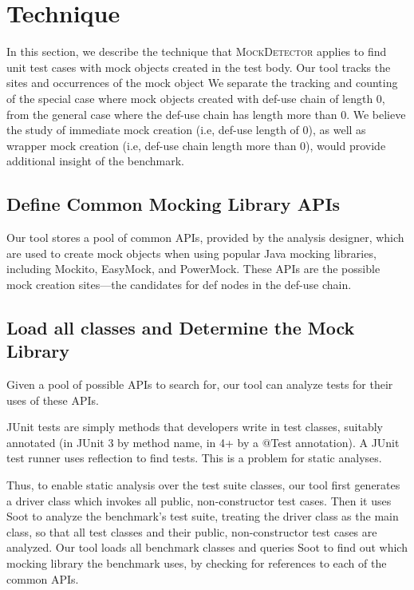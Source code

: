 \section{Technique}
\label{sec:technique}

In this section, we describe the technique that \textsc{MockDetector} applies to find unit test cases with mock objects created in the test body. Our tool tracks the sites and occurrences of the mock object  We separate the tracking and counting of the special case where mock objects created with def-use chain of length 0, from the general case where the def-use chain has length more than 0. We believe the study of immediate mock creation (i.e, def-use length of 0), as well as wrapper mock creation (i.e, def-use chain length more than 0), would provide additional insight of the benchmark. %

\subsection{Define Common Mocking Library APIs}
\label{subsec:collection}

Our tool stores a pool of common APIs, provided by the analysis designer, which are used to create mock objects when using popular Java mocking libraries, including Mockito, EasyMock, and PowerMock. These APIs are the possible mock creation sites---the candidates for def nodes in the def-use chain. %

\subsection{Load all classes and Determine the Mock Library}
\label{subsec:library}

Given a pool of possible APIs to search for, our tool can analyze tests for their uses of these APIs.%

JUnit tests are simply methods that developers write in test classes, suitably annotated (in JUnit 3 by method name, in 4+ by a @Test annotation). A JUnit test runner uses reflection to find tests. This is a problem for static analyses.

Thus, to enable static analysis over the test suite classes, our tool first generates a driver class which invokes all public, non-constructor test cases. Then it uses Soot to analyze the benchmark's test suite, treating the driver class as the main class, so that all test classes and their public, non-constructor test cases are analyzed. Our tool loads all benchmark classes and queries Soot to find out which mocking library the benchmark uses, by checking for references to each of the common APIs.

